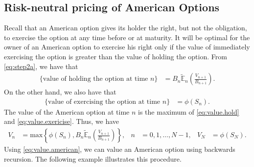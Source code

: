 \documentclass[12pt]{book}
\numberwithin{equation}{chapter}
\theoremstyle{plain}
\numberwithin{theorem}{section}
\theoremstyle{definition}
\numberwithin{exercise}{chapter}
\newcommand{\<}{\langle}
\renewcommand{\>}{\rangle}
\renewcommand{\(}{\left(}
\renewcommand{\)}{\right)}
\renewcommand{\[}{\left[}
\renewcommand{\]}{\right]}
\newcommand\Eb{\mathds{E}}
\newcommand\Ebt{\widetilde{\Eb}}
\theoremstyle{definition}
\numberwithin{question}{section}
\begin{document}
\subsection{Risk-neutral pricing of American Options}
\label{sec:binomial-american}
Recall that an American option gives its holder the right, but not the obligation, to exercise the option at any time before or at maturity.  
It will be optimal for the owner of an American option to exercise his right only if the value of immediately exercising the option is greater than the value of holding the option.   From \eqref{eq:step2a}, we have that
\begin{align}
\{ \text{value of holding the option at time $n$} \}
	&=	B_n \Ebt_n \( \frac{V_{n+1}}{B_{n+1}} \)  . \label{eq:value.hold}
\end{align}
On the other hand, we also have that
\begin{align}
\{\text{value of exercising the option at time $n$} \}
	&=	\phi(S_n) . \label{eq:value.exericise}
\end{align}
The value of the American option at time $n$ is the maximum of \eqref{eq:value.hold} and \eqref{eq:value.exericise}.  Thus, we have
\begin{align}
V_n
	&=	\text{max} \left\{ \phi(S_n) , B_n \Ebt_n \( \frac{V_{n+1}}{B_{n+1}} \) \right\} , &
n
	&=	0, 1, \ldots , N-1 , &
V_N
	&=	\phi(S_N) . \label{eq:value.american}
\end{align}
Using \eqref{eq:value.american}, we can value an American option using backwards recursion.  The following example illustrates this procedure.
\end{document}
